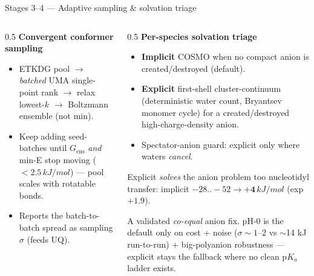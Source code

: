 \documentclass[aspectratio=169,11pt]{beamer}
\newcommand{\kj}{\,kJ/mol}
\newcommand{\arw}{$\rightarrow$}
\begin{document}
\begin{frame}{Stages 3--4 — Adaptive sampling \& solvation triage}
  \begin{columns}[T]
    \begin{column}{0.5\textwidth}
      \textbf{Convergent conformer sampling}
      \begin{itemize}\footnotesize
        \item ETKDG pool \arw{} \emph{batched} UMA single-point rank \arw{} relax lowest-$k$ \arw{} Boltzmann ensemble (not min).
        \item Keep adding seed-batches until $G_{\text{ens}}$ \emph{and} min-E stop moving ($<2.5\kj$) — pool scales with rotatable bonds.
        \item Reports the batch-to-batch spread as sampling $\sigma$ (feeds UQ).
      \end{itemize}
    \end{column}
    \begin{column}{0.5\textwidth}
      \textbf{Per-species solvation triage}
      \begin{itemize}\footnotesize
        \item \textbf{Implicit} COSMO when no compact anion is created/destroyed (default).
        \item \textbf{Explicit} first-shell cluster-continuum (deterministic water count, Bryantsev monomer cycle) for a created/destroyed high-charge-density anion.
        \item Spectator-anion guard: explicit only where waters \emph{cancel}.
      \end{itemize}
      \begin{block}{\footnotesize Explicit \emph{solves} the anion problem too}
        \footnotesize nucleotidyl transfer: implicit $-28..-52 \to \mathbf{+4}\kj$ (exp $+1.9$).
      \end{block}
      {\scriptsize A validated \emph{co-equal} anion fix. pH-0 is the default only on cost + noise
      ($\sigma\!\sim\!1$--$2$ vs $\sim$14 kJ run-to-run) + big-polyanion robustness --- explicit stays
      the fallback where no clean p$K_a$ ladder exists.}
    \end{column}
  \end{columns}
\end{frame}
\end{document}
